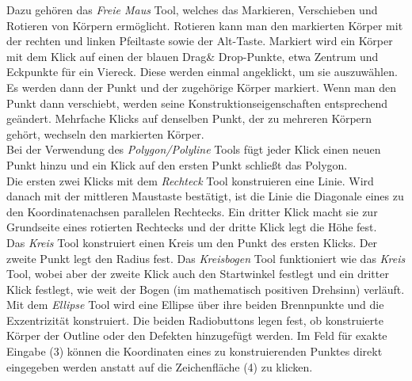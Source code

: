 \documentclass[reducespace,stylepage,semiarbeit]{spezidoc}
\begin{document}
Dazu gehören das \textit{Freie Maus} Tool, welches das Markieren, Verschieben und Rotieren von Körpern ermöglicht. 
Rotieren kann man den markierten Körper mit der rechten und linken Pfeiltaste sowie der Alt-Taste. 
Markiert wird ein Körper mit dem Klick auf einen der blauen Drag\& Drop-Punkte, etwa Zentrum und Eckpunkte für ein Viereck. 
Diese werden einmal angeklickt, um sie auszuwählen. 
Es werden dann der Punkt und der zugehörige Körper markiert. 
Wenn man den Punkt dann verschiebt, werden seine Konstruktionseigenschaften entsprechend geändert. 
Mehrfache Klicks auf denselben Punkt, der zu mehreren Körpern gehört, wechseln den markierten Körper.\\
Bei der Verwendung des \textit{Polygon/Polyline} Tools fügt jeder Klick einen neuen Punkt hinzu und ein Klick auf den ersten Punkt schließt das Polygon.\\
Die ersten zwei Klicks mit dem \textit{Rechteck} Tool konstruieren eine Linie. 
Wird danach mit der mittleren Maustaste bestätigt, ist die Linie die Diagonale eines zu den Koordinatenachsen parallelen Rechtecks. 
Ein dritter Klick macht sie zur Grundseite eines rotierten Rechtecks und der dritte Klick legt die Höhe fest.\\
Das \textit{Kreis} Tool konstruiert einen Kreis um den Punkt des ersten Klicks. 
Der zweite Punkt legt den Radius fest.
Das \textit{Kreisbogen} Tool funktioniert wie das \textit{Kreis} Tool, wobei aber der zweite Klick auch den Startwinkel festlegt und ein dritter Klick festlegt, wie weit der Bogen (im mathematisch positiven Drehsinn) verläuft.\\
Mit dem \textit{Ellipse} Tool wird eine Ellipse über ihre beiden Brennpunkte und die Exzentrizität konstruiert.
Die beiden Radiobuttons legen fest, ob konstruierte Körper der Outline oder den Defekten hinzugefügt werden.
Im Feld für exakte Eingabe (3) können die Koordinaten eines zu konstruierenden Punktes direkt eingegeben werden anstatt auf die Zeichenfläche (4) zu klicken.

\newpage
\end{document}
